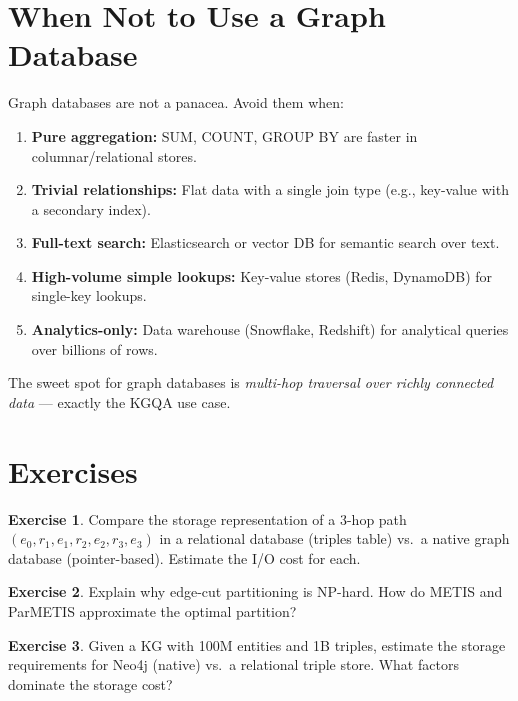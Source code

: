 \documentclass[11pt,a4paper,oneside,openany]{book}
\theoremstyle{definition}
\newtheorem{exercise}{Exercise}[chapter]
\theoremstyle{plain}
\theoremstyle{remark}
\begin{document}
\section{When Not to Use a Graph Database}\label{sec:no-graph}

Graph databases are not a panacea. Avoid them when:

\begin{enumerate}
	\item \textbf{Pure aggregation:} SUM, COUNT, GROUP BY are faster in columnar/relational stores.
	\item \textbf{Trivial relationships:} Flat data with a single join type (e.g., key-value with a secondary index).
	\item \textbf{Full-text search:} Elasticsearch or vector DB for semantic search over text.
	\item \textbf{High-volume simple lookups:} Key-value stores (Redis, DynamoDB) for single-key lookups.
	\item \textbf{Analytics-only:} Data warehouse (Snowflake, Redshift) for analytical queries over billions of rows.
\end{enumerate}

The sweet spot for graph databases is \emph{multi-hop traversal over richly connected data} --- exactly the KGQA use case.

\section{Exercises}

\begin{exercise}
	Compare the storage representation of a 3-hop path $(e_0, r_1, e_1, r_2, e_2, r_3, e_3)$ in a relational database (triples table) vs.\ a native graph database (pointer-based). Estimate the I/O cost for each.
\end{exercise}

\begin{exercise}
	Explain why edge-cut partitioning is NP-hard. How do METIS and ParMETIS approximate the optimal partition?
\end{exercise}

\begin{exercise}
	Given a KG with 100M entities and 1B triples, estimate the storage requirements for Neo4j (native) vs.\ a relational triple store. What factors dominate the storage cost?
\end{exercise}
\end{document}

